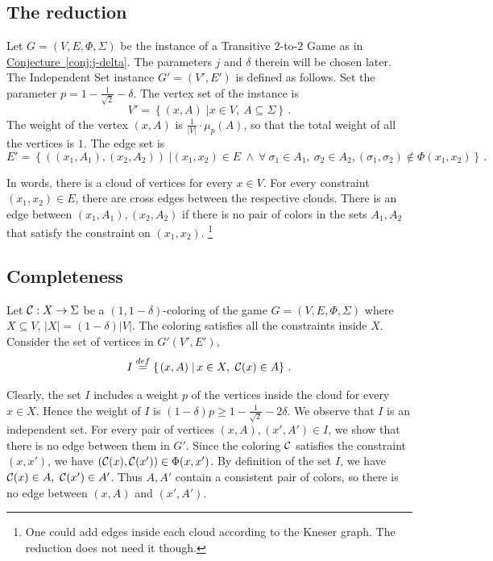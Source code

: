 \documentclass[11pt]{article}
\numberwithin{equation}{section}
\theoremstyle{definition}
\theoremstyle{plain}
\newcommand{\expref}[2]{\hyperref[#2]{#1~\ref{#2}}}
\newcommand\sett[2]{\left\{ \left. #1 \;\right\vert #2 \right\}}
\newcommand\defeq{\stackrel{def}{=}}
\renewcommand\geq{\geqslant}
\begin{document}
\subsection{The reduction}

Let $G=(V,E,\Phi,\Sigma)$ be the instance of a Transitive $2$-to-$2$ Game as in \expref{Conjecture}{conj:j-delta}. The parameters $j$ and $\delta$ therein will be chosen later.
The Independent Set instance $G'=(V',E')$ is defined as follows. Set the parameter $p=1-\frac{1}{\sqrt{2}}-\delta$.
The vertex set of the instance is
\[
V'= \sett{(x,A)}{ x \in V, ~A\subseteq \Sigma}\,.%
\]
The weight of the vertex $(x,A)$ is  $\frac{1}{|V|} \cdot \mu_p(A)$, so that the total weight of all the vertices is $1$. The edge set is
\[
E' = \sett{((x_1,A_1),(x_2,A_2))}{ (x_1,x_2)\in E \ \land \ \forall  ~\sigma_1 \in A_1,
 \ \sigma_2 \in A_2,  (\sigma_1, \sigma_2) \not\in \Phi(x_1, x_2)}\,.%
\]

In words, there is a cloud of vertices for every $x \in V$.
For every constraint $(x_1, x_2) \in E$, there are cross edges between the
respective clouds.  %
There is an edge between $(x_1,A_1),(x_2,A_2)$ if there is no pair of
colors in the sets $A_1,A_2$ that satisfy the constraint on $(x_1,x_2)$. \footnote{ One could add edges inside each cloud according to the
 Kneser graph. The reduction does not need it though.}


\subsection{Completeness}
Let ${\cal C}: X \to \Sigma$ be a $(1,1-\delta)$-coloring of the game  $G=(V,E,\Phi,\Sigma)$ where $X \subseteq V$, $|X|=(1-\delta)|V|$. The coloring
satisfies all the constraints inside $X$. Consider the set of vertices in $G'(V',E')$,
\[
I\defeq\sett{(x,A)}{x\in X, ~ {\cal C}(x)\in A}\,.%
\]

Clearly, the set $I$ includes a weight $p$ of the vertices inside the cloud for every $x \in X$. Hence the weight of $I$ is
$(1-\delta) p \geq 1-\frac{1}{\sqrt{2}} - 2\delta $. We observe that
$I$ is an independent set. For every pair of vertices
 $(x,A),(x',A')\in I$, we show that there is no edge between them in $G'$. Since the coloring
${\cal C}$ satisfies the constraint $(x,x')$, we have $({\cal C}(x), {\cal C}(x')) \in \Phi(x,x')$.
By definition of the set $I$, we have  ${\cal C}(x) \in A,  ~{\cal C}(x') \in A'$.  Thus $A,A'$ contain a consistent pair of colors,
so there is no edge between $(x,A)$ and $(x',A')$.
\end{document}
